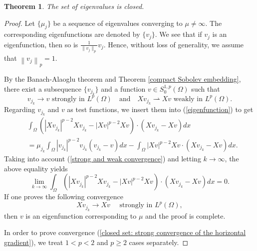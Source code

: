 \documentclass[a4paper,12pt,reqno]{amsart}
\renewcommand\eqref[1]{(\ref{#1})} %
\numberwithin{equation}{section}
\theoremstyle{plain}
\newtheorem{thm}{Theorem}[section]
\theoremstyle{definition}
\begin{document}
\begin{thm}\label{closed set}
The set of eigenvalues is closed.
\end{thm}
\begin{proof} 
Let $\{\mu_{j}\}$ be a  sequence of eigenvalues converging to $\mu\neq \infty$. The corresponding  eigenfunctions are denoted by $\{v_{j}\}$. We see that if $v_{j}$ is an eigenfunction, then so is $\frac{1}{\|v_{j}\|_{p}}v_{j}$. Hence, without loss of generality, we assume that
$\left\|v_{j}\right\|_{p}=1$.

By the Banach-Alaoglu theorem and Theorem \ref{compact Sobolev embedding}, there exist a subsequence $\{v_{j_{k}}\}$ and a function $v\in S_{0}^{1,p}(\Omega)$ such that
\begin{equation}\label{strong and weak convergence}
v_{j_{k}} \to v \text{ strongly in } L^{p}(\Omega)\quad\text{and} \quad X v_{j_{k}} \rightharpoonup  X v \text{ weakly in } L^{p}(\Omega). 
\end{equation}
Regarding $v_{j_{k}}$ and $v$ as test functions, we insert them into \eqref{eigenfunction} to get
\begin{equation*}
\begin{aligned}
&\int_{\Omega}\left(\left|X v_{j_{k}}\right|^{p-2} X v_{j_{k}}-|X v|^{p-2} X v\right) \cdot \left(Xv_{j_{k}}-Xv\right) d x \\
&=\mu_{j_{k}} \int_{\Omega}\left|v_{j_{k}}\right|^{p-2} v_{j_{k}}\left(v_{j_{k}}-v\right) d x-\int_{\Omega}|X v|^{p-2} X v \cdot\left(X v_{j_{k}}-X v\right) d x .
\end{aligned}
\end{equation*}
Taking into account \eqref{strong and weak convergence} and letting $k\to \infty$, the above equality yields 
\begin{equation}\label{closed set: limit}
\lim _{k \rightarrow \infty} \int_{\Omega}\left(\left|X v_{j_{k}}\right|^{p-2} X v_{j_{k}}-|X v|^{p-2} X v\right) \cdot\left(X v_{j_{k}}-X v\right) d x=0 .
\end{equation}
If one proves the following convergence
\begin{equation}\label{closed set: strong convergence of the horizontal gradient}
X v_{j_{k}} \to  X v\quad \text{ strongly in } L^{p}(\Omega), 
\end{equation}
then $v$ is an eigenfunction corresponding to $\mu$ and the proof is complete. 

In order to prove convergence \eqref{closed set: strong convergence of the horizontal gradient}, we treat $1<p<2$ and $p\geq2$ cases separately.


\end{proof}
\end{document}
